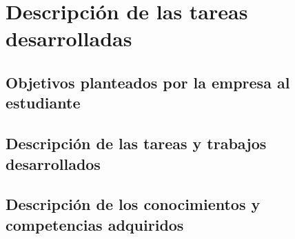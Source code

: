 \section{Descripción de las tareas desarrolladas}
\subsection{Objetivos planteados por la empresa al estudiante}


\subsection{Descripción de las tareas y trabajos desarrollados}


\subsection{Descripción de los conocimientos y competencias adquiridos}


\newpage